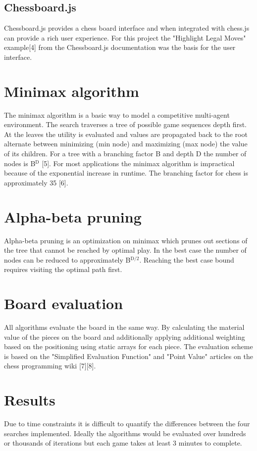 \documentclass[11pt]{article}
\begin{document}
\subsection*{Chessboard.js}
\label{sec:org9fc7a5f}
Chessboard.js provides a chess board interface and when integrated with chess.js can provide a rich user experience. For this project the "Highlight Legal Moves" example[4] from the Chessboard.js documentation was the basis for the user interface.

\section*{Minimax algorithm}
\label{sec:orgc9419a0}
The minimax algorithm is a basic way to model a competitive multi-agent environment. The search traverses a tree of possible game sequences depth first. At the leaves the utility is evaluated and values are propagated back to the root alternate between minimizing (min node) and maximizing (max node) the value of its children. For a tree with a branching factor B and depth D the number of nodes is B\(^{\text{D}}\) [5]. For most applications the minimax algorithm is impractical because of the exponential increase in runtime. The branching factor for chess is approximately 35 [6].

\section*{Alpha-beta pruning}
\label{sec:org987eece}
Alpha-beta pruning is an optimization on minimax which prunes out sections of the tree that cannot be reached by optimal play. In the best case the number of nodes can be reduced to approximately B\(^{\text{D/2}}\). Reaching the best case bound requires visiting the optimal path first.

\section*{Board evaluation}
\label{sec:orgb3c30b5}
All algorithms evaluate the board in the same way. By calculating the material value of the pieces on the board and additionally applying additional weighting based on the positioning using static arrays for each piece. The evaluation scheme is based on the "Simplified Evaluation Function" and "Point Value" articles on the chess programming wiki [7][8]. 

\section*{Results}
\label{sec:orgca4dcea}
Due to time constraints it is difficult to quantify the differences between the four searches implemented. Ideally the algorithms would be evaluated over hundreds or thousands of iterations but each game takes at least 3 minutes to complete.
\end{document}
